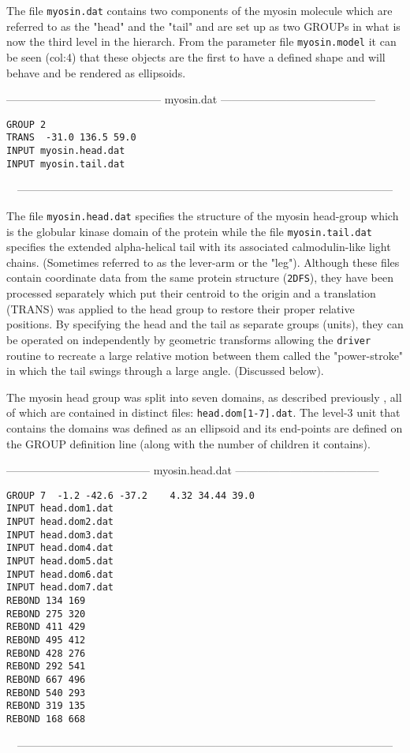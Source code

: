 The file {\tt myosin.dat} contains two components of the myosin molecule which 
are referred to as the "head" and the "tail" and are set up as two GROUPs in what
is now the third level in the hierarch.   From the parameter file {\tt myosin.model}
it can be seen (col:4) that these objects are the first to have a defined shape
and will behave and be rendered as ellipsoids.

\begin{singlespace}
------------------------------------------
myosin.dat
------------------------------------------
\begin{verbatim}
GROUP 2
TRANS  -31.0 136.5 59.0
INPUT myosin.head.dat
INPUT myosin.tail.dat
\end{verbatim}
\ \ ------------------------------------------------------------------------------------------------------
\end{singlespace}

The file {\tt myosin.head.dat} specifies the structure of the myosin head-group 
which is the globular kinase domain of the protein while the file {\tt myosin.tail.dat}
specifies the extended alpha-helical tail with its associated calmodulin-like
light chains. (Sometimes referred to as the lever-arm or the "leg").   Although these
files contain coordinate data from the same protein structure ({\tt 2DFS}), they have 
been processed separately which put their centroid to the origin and a translation
(TRANS) was applied to the head group to restore their proper relative positions.
By specifying the head and the tail as separate groups (units), they can be
operated on independently by geometric transforms allowing the {\tt driver} routine
to recreate a large relative motion between them called the "power-stroke" in which
the tail swings through a large angle. (Discussed below).

The myosin head group was split into seven domains, as described previously \cite{TaylorWRet10b},
all of which are contained in distinct files: {\tt head.dom[1-7].dat}.  The level-3 unit that
contains the domains was defined as an ellipsoid and its end-points are defined on the
GROUP definition line (along with the number of children it contains). 

\begin{singlespace}
---------------------------------------
myosin.head.dat
---------------------------------------
\begin{verbatim}
GROUP 7  -1.2 -42.6 -37.2    4.32 34.44 39.0
INPUT head.dom1.dat
INPUT head.dom2.dat
INPUT head.dom3.dat
INPUT head.dom4.dat
INPUT head.dom5.dat
INPUT head.dom6.dat
INPUT head.dom7.dat
REBOND 134 169
REBOND 275 320
REBOND 411 429
REBOND 495 412
REBOND 428 276
REBOND 292 541
REBOND 667 496
REBOND 540 293
REBOND 319 135
REBOND 168 668
\end{verbatim}
\ \ ------------------------------------------------------------------------------------------------------
\end{singlespace}

